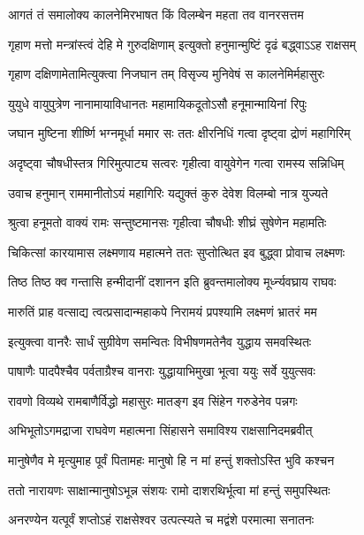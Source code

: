 \twolineshloka
{आगतं तं समालोक्य कालनेमिरभाषत}
{किं विलम्बेन महता तव वानरसत्तम} %

\twolineshloka
{गृहाण मत्तो मन्त्रांस्त्वं देहि मे गुरुदक्षिणाम्}
{इत्युक्तो हनुमान्मुष्टिं दृढं बद्ध्वाऽऽह राक्षसम्} %

\twolineshloka
{गृहाण दक्षिणामेतामित्युक्त्वा निजघान तम्}
{विसृज्य मुनिवेषं स कालनेमिर्महासुरः} %

\twolineshloka
{युयुधे वायुपुत्रेण नानामायाविधानतः}
{महामायिकदूतोऽसौ हनूमान्मायिनां रिपुः} %

\twolineshloka
{जघान मुष्टिना शीर्ष्णि भग्नमूर्धा ममार सः}
{ततः क्षीरनिधिं गत्वा दृष्ट्वा द्रोणं महागिरिम्} %

\twolineshloka
{अदृष्ट्वा चौषधीस्तत्र गिरिमुत्पाट्य सत्वरः}
{गृहीत्वा वायुवेगेन गत्वा रामस्य सन्निधिम्} %

\twolineshloka
{उवाच हनुमान् राममानीतोऽयं महागिरिः}
{यद्युक्तं कुरु देवेश विलम्बो नात्र युज्यते} %

\twolineshloka
{श्रुत्वा हनूमतो वाक्यं रामः सन्तुष्टमानसः}
{गृहीत्वा चौषधीः शीघ्रं सुषेणेन महामतिः} %

\twolineshloka
{चिकित्सां कारयामास लक्ष्मणाय महात्मने}
{ततः सुप्तोत्थित इव बुद्ध्वा प्रोवाच लक्ष्मणः} %

\twolineshloka
{तिष्ठ तिष्ठ क्व गन्तासि हन्मीदानीं दशानन}
{इति ब्रुवन्तमालोक्य मूर्ध्न्यवघ्राय राघवः} %

\twolineshloka
{मारुतिं प्राह वत्साद्य त्वत्प्रसादान्महाकपे}
{निरामयं प्रपश्यामि लक्ष्मणं भ्रातरं मम} %

\twolineshloka
{इत्युक्त्वा वानरैः सार्धं सुग्रीवेण समन्वितः}
{विभीषणमतेनैव युद्धाय समवस्थितः} %

\twolineshloka
{पाषाणैः पादपैश्चैव पर्वताग्रैश्च वानराः}
{युद्धायाभिमुखा भूत्वा ययुः सर्वे युयुत्सवः} %

\twolineshloka
{रावणो विव्यथे रामबाणैर्विद्धो महासुरः}
{मातङ्ग इव सिंहेन गरुडेनेव पन्नगः} %

\twolineshloka
{अभिभूतोऽगमद्राजा राघवेण महात्मना}
{सिंहासने समाविश्य राक्षसानिदमब्रवीत्} %

\twolineshloka
{मानुषेणैव मे मृत्युमाह पूर्वं पितामहः}
{मानुषो हि न मां हन्तुं शक्तोऽस्ति भुवि कश्चन} %

\twolineshloka
{ततो नारायणः साक्षान्मानुषोऽभून्न संशयः}
{रामो दाशरथिर्भूत्वा मां हन्तुं समुपस्थितः} %

\twolineshloka
{अनरण्येन यत्पूर्वं शप्तोऽहं राक्षसेश्वर}
{उत्पत्स्यते च मद्वंशे परमात्मा सनातनः} %

